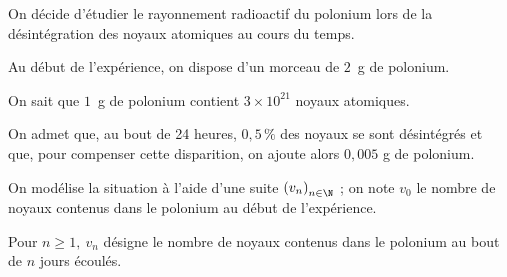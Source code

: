 \medskip

On décide d'étudier le rayonnement radioactif du polonium lors de la désintégration des noyaux atomiques au cours du temps.

Au début de l'expérience, on dispose d'un morceau de $2$~g de polonium.

On sait que $1$~g de polonium contient $3 \times 10^{21}$ noyaux atomiques.

On admet que, au bout de 24 heures, $0,5\,\%$ des noyaux se sont désintégrés et que, pour compenser cette disparition, on ajoute alors $0,005$ g de polonium.

On modélise la situation à l'aide d'une suite $\left(v_n\right)_{n \in \N}$ ; on note $v_0$ le nombre de noyaux contenus dans le polonium au début de l'expérience. 

Pour $n \geqslant 1,\: v_n$ désigne le nombre de noyaux contenus dans le polonium au bout de $n$ jours écoulés.

\medskip

